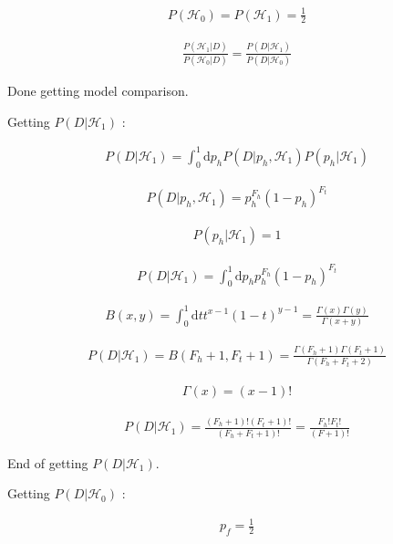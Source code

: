 \documentclass[12pt]{article}
\begin{document}
\begin{gather}
P(\mathcal{H}_0) = P(\mathcal{H}_1) = \frac{1}{2}
\end{gather}

\begin{gather}
\frac{P(\mathcal{H}_1 | D)}{P(\mathcal{H}_0 | D)} = \frac{P(D | \mathcal{H}_1)}{P(D | \mathcal{H}_0)}
\end{gather}

Done getting model comparison.

Getting $P(D|\mathcal{H}_1)$ :

\begin{gather}
P(D|\mathcal{H}_1) = \int_0^1 \! \mathrm{d}p_h P(D|p_h,\mathcal{H}_1)P(p_h|\mathcal{H}_1)
\end{gather}

\begin{gather}
P(D|p_h,\mathcal{H}_1) = p_h^{F_h}(1 - p_h)^{F_t}
\end{gather}

\begin{gather}
P(p_h|\mathcal{H}_1) = 1
\end{gather}

\begin{gather}
P(D|\mathcal{H}_1) = \int_0^1 \! \mathrm{d}p_h p_h^{F_h}(1 - p_h)^{F_t}
\end{gather}

\begin{gather}
B(x,y) = \int_0^1 \! \mathrm{d}t t^{x-1}(1-t)^{y-1} = \frac{\Gamma(x)\Gamma(y)}{\Gamma(x+y)}
\end{gather}

\begin{gather}
P(D|\mathcal{H}_1) = B(F_h+1,F_t+1) = \frac{\Gamma(F_h+1)\Gamma(F_t+1)}{\Gamma(F_h+F_t+2)}
\end{gather}

\begin{gather}
\Gamma(x) = (x-1)!
\end{gather}

\begin{gather}
P(D|\mathcal{H}_1) = \frac{(F_h+1)!(F_t+1)!}{(F_h+F_t+1)!} = \frac{F_h!F_t!}{(F+1)!}
\end{gather}

End of getting $P(D|\mathcal{H}_1)$.

Getting $P(D|\mathcal{H}_0)$ :

\begin{gather}
p_f = \frac{1}{2}
\end{gather}
\end{document}
